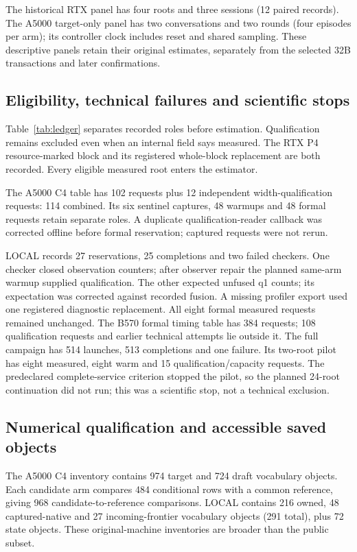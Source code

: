 The historical RTX panel has four roots and three sessions (12 paired records). The A5000 target-only panel has two conversations and two rounds (four episodes per arm); its controller clock includes reset and shared sampling. These descriptive panels retain their original estimates, separately from the selected 32B transactions and later confirmations.

\FloatBarrier
\subsection{Eligibility, technical failures and scientific stops}
\label{supp:ledger}
Table~\ref{tab:ledger} separates recorded roles before estimation. Qualification remains excluded even when an internal field says measured. The RTX P4 resource-marked block and its registered whole-block replacement are both recorded. Every eligible measured root enters the estimator.


The A5000 C4 table has 102 requests plus 12 independent width-qualification requests: 114 combined. Its six sentinel captures, 48 warmups and 48 formal requests retain separate roles. A duplicate qualification-reader callback was corrected offline before formal reservation; captured requests were not rerun.

LOCAL records 27 reservations, 25 completions and two failed checkers. One checker closed observation counters; after observer repair the planned same-arm warmup supplied qualification. The other expected unfused q1 counts; its expectation was corrected against recorded fusion. A missing profiler export used one registered diagnostic replacement. All eight formal measured requests remained unchanged. The B570 formal timing table has 384 requests; 108 qualification requests and earlier technical attempts lie outside it. The full campaign has 514 launches, 513 completions and one failure. Its two-root pilot has eight measured, eight warm and 15 qualification/capacity requests. The predeclared complete-service criterion stopped the pilot, so the planned 24-root continuation did not run; this was a scientific stop, not a technical exclusion.

\FloatBarrier
\subsection{Numerical qualification and accessible saved objects}
\label{supp:access}
The A5000 C4 inventory contains 974 target and 724 draft vocabulary objects. Each candidate arm compares 484 conditional rows with a common reference, giving 968 candidate-to-reference comparisons. LOCAL contains 216 owned, 48 captured-native and 27 incoming-frontier vocabulary objects (291 total), plus 72 state objects. These original-machine inventories are broader than the public subset.

